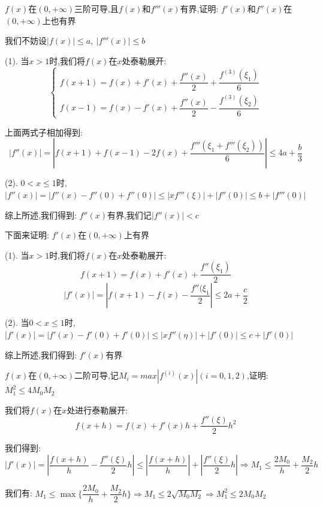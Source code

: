
\begin{proposition}
	$f(x)$在$(0,+\infty)$三阶可导,且$f(x)$和$f'''(x)$有界,证明: $f'(x)$和$f''(x)$在$(0,+\infty)$上也有界
\end{proposition}
\begin{solution}

	我们不妨设$|f(x)|\leq a,\ |f'''(x)|\leq b$

	(1). 当$x>1$时,我们将$f(x)$在$x$处泰勒展开:
	$$\left\lbrace
		\begin{array}{l}
			f(x+1)=f(x)+f'(x)+\dfrac{f''(x)}{2}+\dfrac{f^{(3)}(\xi_{1})}{6} \\
			f(x-1)=f(x)-f'(x)+\dfrac{f''(x)}{2}-\dfrac{f^{(3)}(\xi_{2})}{6}
		\end{array}
		\right. $$

	上面两式子相加得到:
	$$|f''(x)|=|f(x+1)+f(x-1)-2f(x)+\dfrac{f'''(\xi_{1}+f'''(\xi_{2}))}{6}|\leq 4a+\dfrac{b}{3}$$

	(2). $0<x\leq 1$时,$|f''(x)|=|f''(x)-f''(0)+f''(0)|\leq |xf'''(\xi)|+|f''(0)|\leq b+|f'''(0)|$

	综上所述,我们得到: $f''(x)$有界,我们记$|f''(x)|<c$

	下面来证明: $f'(x)$在$(0,+\infty)$上有界

	(1). 当$x>1$时,我们将$f(x)$在$x$处泰勒展开:
	$$f(x+1)=f(x)+f'(x)+\dfrac{f''(\xi_{1})}{2}$$
	$$|f'(x)|=|f(x+1)-f(x)-\dfrac{f''(\xi_{1}}{2}|\leq 2a+\dfrac{c}{2}$$

	(2). 当$0<x\leq 1$时,$|f'(x)|=|f'(x)-f'(0)+f'(0)|\leq |xf''(\eta)|+|f'(0)|\leq c+|f'(0)|$

	综上所述,我们得到: $f'(x)$有界
\end{solution}


\begin{proposition}
	$f(x)$在$(0,+\infty)$二阶可导,记$M_{i}=max|f^{(i)}(x)|(i=0,1,2)$,证明: $M_{1}^2\leq 4M_{0}M_{2}$
\end{proposition}
\begin{solution}

	我们将$f(x)$在$x$处进行泰勒展开:
	$$f(x+h)=f(x)+f'(x)h+\dfrac{f''(\xi)}{2}h^2$$

	我们得到:
	$$|f'(x)|=|\dfrac{f(x+h)}{h}-\dfrac{f''(\xi)}{2}h|\leq |\dfrac{f(x+h)}{h}|+|\dfrac{f''(\xi)}{2}h|\Rightarrow M_{1}\leq \dfrac{2M_{0}}{h}+\dfrac{M_{2}}{2}h$$

	我们有: $M_{1}\leq \max\{\dfrac{2M_{0}}{h}+\dfrac{M_{2}}{2}h\}\Rightarrow M_{1}\leq 2\sqrt{M_{0}M_{2}}\Rightarrow M_{1}^2\leq 2M_{0}M_{2}$
\end{solution}

